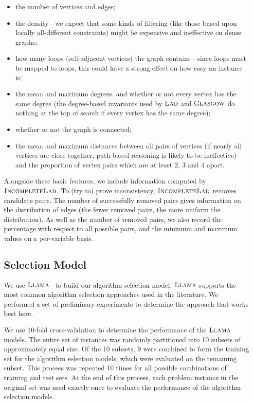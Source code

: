 \documentclass{llncs}
\newcommand{\Glasgow}{$\textsc{Glasgow}$\xspace}
\newcommand{\LAD}{$\textsc{Lad}$\xspace}
\newcommand{\IncompleteLAD}{$\textsc{IncompleteLad}$\xspace}
\newcommand{\LLAMA}{$\textsc{Llama}$\xspace}
\begin{document}
\begin{itemize}
    \item the number of vertices and edges;
    \item the density---we expect that some kinds of filtering (like those based upon locally
        all-different constraints) might be expensive and ineffective on
        dense graphs;
    \item how many loops (self-adjacent vertices) the graph contains---since loops must be mapped to
        loops, this could have a strong effect on how easy an instance is;
    \item the mean and maximum degrees, and whether or not every vertex has the same degree (the
        degree-based invariants used by \LAD and \Glasgow do nothing at the top of search if every
        vertex has the same degree);
    \item whether or not the graph is connected;
    \item the mean and maximum distances between all pairs of vertices (if nearly all vertices are
        close together, path-based reasoning is likely to be ineffective) and
        the proportion of vertex pairs which are at least 2, 3 and 4 apart.
\end{itemize}

\noindent Alongside these basic features, we include information computed by \IncompleteLAD. To (try to) prove
inconsistency, \IncompleteLAD removes candidate pairs. The number of successfully removed pairs
gives information on the distribution of edges (the fewer removed pairs, the more uniform the
distribution). As well as the number of removed pairs, we also record the percentage with respect to
all possible pairs, and the minimum and maximum values on a per-variable basis.

\subsection{Selection Model}

We use \LLAMA~\cite{kotthoff_llama_2013} to build our algorithm selection model.
\LLAMA supports the most common algorithm selection approaches used in the literature. We performed a
set of preliminary experiments to determine the approach that works best here.

We use 10-fold cross-validation to determine the performance of the \LLAMA models. The entire set of
instances was randomly partitioned into 10 subsets of approximately equal size. Of the 10 subsets, 9
were combined to form the training set for the algorithm selection models, which were evaluated on
the remaining subset. This process was repeated 10 times for all possible combinations of training
and test sets. At the end of this process, each problem instance in the original set was used
exactly once to evaluate the performance of the algorithm selection models.
\end{document}
